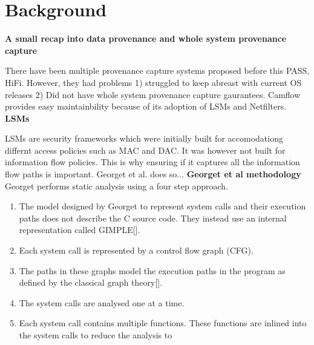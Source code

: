 \section{Background}

\textbf{A small recap into data provenance and whole system provenance capture}

There have been multiple provenance capture systems proposed before this PASS, HiFi. However, they had problems 1) struggled to keep abreast with current OS releases 2) Did not have whole system provenance capture gaurantees. Camflow provides easy maintainbility because of its adoption of LSMs and Netfilters.
\vskip 0.1in
\textbf{LSMs}

LSMs are security frameworks which were initially built for accomodationg differnt access policies such as MAC and DAC. It was however not built for information flow policies. This is why ensuring if it captures all the information flow paths is important. Georget et al. does so...
\vskip 0.1in
\textbf{Georget et al methodology}
Georget performs static analysis using a four step approach. 
\begin{enumerate}
	\item The model designed by Georget to represent system calls and their execution paths does not describe the C source code. They instead use an internal representation called GIMPLE[]. 
	\item Each system call is represented by a control flow graph (CFG). 
	\item The paths in these graphs model the execution paths in the program as defined by the classical graph theory[].
	\item The system calls are analysed one at a time. 
	\item Each system call contains multiple functions. These functions are inlined into the system calls to reduce the analysis to 
\end{enumerate}
